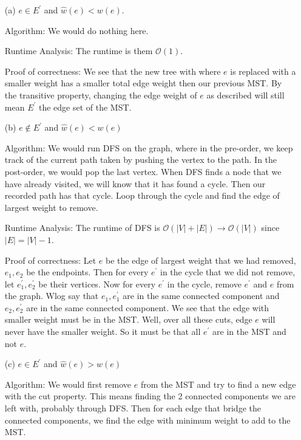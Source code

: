 \documentclass{article}
\begin{document}
\begin{itemize}
    \item [(a)] $e \in E^{\prime}$ and $\hat{w}(e) < w(e)$. 
        \begin{answer}
            Algorithm: We would do nothing here.

            Runtime Analysis: The runtime is them $\mathcal{O}(1)$.

            Proof of correctness: We see that the new tree with where $e$ is replaced with a smaller weight has a smaller total edge weight then our previous MST. By the transitive property, changing the edge weight of $e$ as described will still mean $E^{\prime}$ the edge set of the MST. 
        \end{answer}

    \item [(b)] $e \notin E^{\prime}$ and $\hat{w}(e) < w(e)$
        \begin{answer}
            Algorithm: We would run DFS on the graph, where in the pre-order, we keep track of the current path taken by pushing the vertex to the path. In the post-order, we would pop the last vertex. When DFS finds a node that we have already visited, we will know that it has found a cycle. Then our recorded path has that cycle. Loop through the cycle and find the edge of largest weight to remove.

            Runtime Analysis: The runtime of DFS is $\mathcal{O}(\lvert V \rvert + \lvert E \rvert) \rightarrow \mathcal{O}(\lvert V \rvert)$ since $\lvert E \rvert = \lvert V \rvert - 1$.

            Proof of correctness: Let $e$ be the edge of largest weight that we had removed, $e_{1}, e_{2}$ be the endpoints. Then for every $e^{\prime}$ in the cycle that we did not remove, let $e_{1}^{\prime}, e_{2}^{\prime}$ be their vertices. Now for every $e^{\prime}$ in the cycle, remove $e^{\prime}$ and $e$ from the graph. Wlog say that $e_{1}, e^{\prime}_{1}$ are in the same connected component and $e_{2}, e^{\prime}_{2}$ are in the same connected component. We see that the edge with smaller weight must be in the MST. Well, over all these cuts, edge $e$ will never have the smaller weight. So it must be that all $e^{\prime}$ are in the MST and not $e$.
        \end{answer}

    \item [(c)] $e \in E^{\prime}$ and $\hat{w}(e) > w(e)$
        \begin{answer}
            Algorithm: We would first remove $e$ from the MST and try to find a new edge with the cut property. This means finding the 2 connected components we are left with, probably through DFS. Then for each edge that bridge the connected components, we find the edge with minimum weight to add to the MST.


\end{answer}
\end{itemize}
\end{document}
